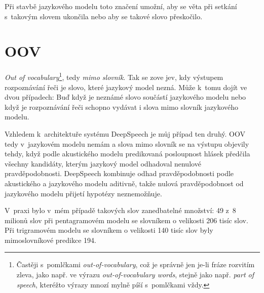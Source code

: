 Při stavbě jazykového modelu toto značení umožní, aby se věta při setkání
s~takovým slovem ukončila nebo aby se takové slovo přeskočilo.

\section{OOV}

{\em{}Out of vocabulary}\footnote{Častěji s~pomlčkami {\em out-of-vocabulary},
což je správně jen je-li fráze rozvitím zleva, jako např. ve výrazu {\em
out-of-vocabulary words}, stejně jako např. {\em part of speech}, kteréžto
výrazy mnozí mylně píší s~pomlčkami vždy.}, tedy {\em mimo slovník}. Tak se zove
jev, kdy výstupem rozpoznávání řeči je slovo, které jazykový model nezná. Může
k~tomu dojít ve dvou případech: Buď když je neznámé slovo součástí jazykového
modelu nebo když je rozpoznávání řeči schopno vydávat i slova mimo slovník
jazykového modelu.

Vzhledem k~architektuře systému DeepSpeech je můj případ ten druhý. OOV tedy
v~jazykovém modelu nemám a slova mimo slovník se na výstupu objevily tehdy, když
podle akustického modelu predikovaná posloupnost hlásek předčila všechny
kandidáty, kterým jazykový model odhadoval nenulové pravděpodobnosti. DeepSpeech
kombinuje odhad pravděpodobnosti podle akustického a jazykového modelu aditivně,
takže nulová pravděpodobnost od jazykového modelu přijetí hypotézy neznemožňuje.

V~praxi bylo v~mém případě takových slov zanedbatelné množství: 49 z~8 milionů
slov při pentagramovém modelu se slovníkem o velikosti 206 tisíc slov. Při
trigramovém modelu se slovníkem o velikosti 140 tisíc slov byly mimoslovníkové
predikce 194.

%
%
%
%

